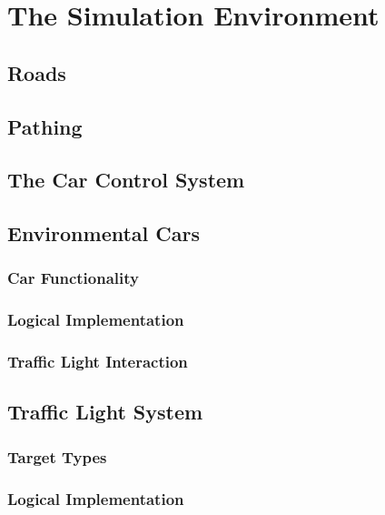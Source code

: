 \documentclass{article}
\begin{document}
\section{The Simulation Environment}
\lipsum[2][1]

\subsection{Roads}
\lipsum[2][1]

\subsection{Pathing}
\lipsum[2][1]

\subsection{The Car Control System}
\lipsum[2][1]

\subsection{Environmental Cars}
\lipsum[2][1]

\subsubsection{Car Functionality}
\lipsum[2][1]

\subsubsection{Logical Implementation}
\lipsum[2][1]

\subsubsection{Traffic Light Interaction}
\lipsum[2][1]

\subsection{Traffic Light System}
\lipsum[2][1]

\subsubsection{Target Types}
\lipsum[2][1]

\subsubsection{Logical Implementation}
\lipsum[2][1]
\end{document}
